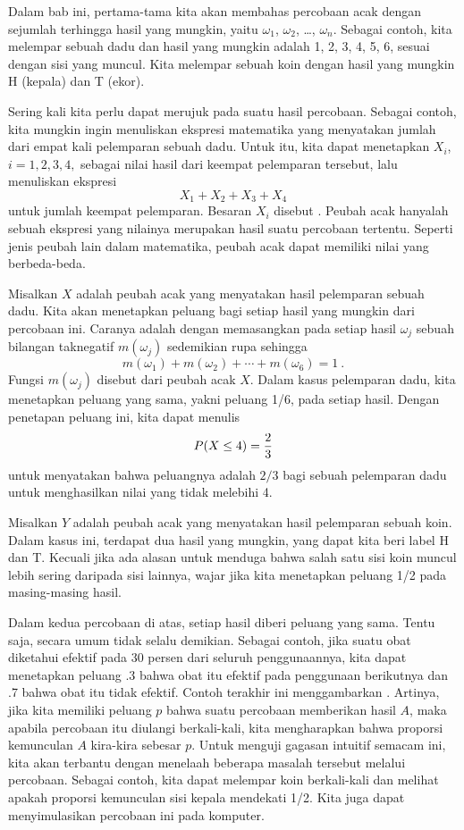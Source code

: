 Dalam bab ini, pertama-tama kita akan membahas percobaan acak dengan sejumlah
terhingga hasil yang mungkin, yaitu $\omega_1$, $\omega_2$, \dots, $\omega_n$.  Sebagai contoh, kita
melempar sebuah dadu dan hasil yang mungkin adalah 1, 2, 3, 4, 5, 6, sesuai dengan
sisi yang muncul.  Kita melempar sebuah koin dengan hasil yang mungkin H (kepala) dan T
(ekor).  
\par
Sering kali kita perlu dapat merujuk pada suatu hasil percobaan.  Sebagai 
contoh, kita mungkin ingin menuliskan ekspresi matematika yang menyatakan jumlah dari empat kali pelemparan
sebuah dadu.  Untuk itu, kita dapat menetapkan $X_i$, $i = 1, 2, 3, 4,$ sebagai nilai
hasil dari keempat pelemparan tersebut, lalu menuliskan ekspresi
$$X_1 + X_2 + X_3 + X_4$$
untuk jumlah keempat pelemparan.  Besaran $X_i$ disebut .
Peubah acak hanyalah sebuah ekspresi yang nilainya merupakan hasil suatu
percobaan tertentu.  Seperti jenis peubah lain dalam matematika, peubah acak
dapat memiliki nilai yang berbeda-beda.
\par
Misalkan $X$ adalah peubah acak yang menyatakan hasil pelemparan sebuah dadu.  Kita akan menetapkan
peluang bagi setiap hasil yang mungkin dari percobaan ini.  Caranya adalah dengan memasangkan pada setiap
hasil $\omega_j$ sebuah bilangan taknegatif $m(\omega_j)$ sedemikian rupa sehingga
$$ 
m(\omega_1) + m(\omega_2) + \cdots + m(\omega_6) = 1\ .
$$
Fungsi $m(\omega_j)$ disebut  dari peubah acak
$X$.  Dalam kasus pelemparan dadu, kita menetapkan peluang yang sama, yakni
peluang 1/6, pada setiap hasil.  Dengan penetapan peluang ini, kita dapat menulis
$$
P(X \le 4) = {2\over 3}
$$
untuk menyatakan bahwa peluangnya adalah $2/3$ bagi sebuah pelemparan dadu untuk menghasilkan nilai yang
tidak melebihi 4.  
\par
Misalkan $Y$ adalah peubah acak yang menyatakan hasil pelemparan sebuah koin.  Dalam kasus ini, terdapat
dua hasil yang mungkin, yang dapat kita beri label H dan T.  Kecuali jika ada alasan untuk menduga bahwa
salah satu sisi koin muncul lebih sering daripada sisi lainnya, wajar jika kita menetapkan
peluang 1/2 pada masing-masing hasil.
\par
Dalam kedua percobaan di atas, setiap hasil diberi peluang yang sama.  Tentu saja, secara umum
tidak selalu demikian.  Sebagai contoh, jika suatu obat diketahui efektif pada 30 persen dari seluruh
penggunaannya, kita dapat menetapkan peluang .3 bahwa obat itu efektif pada penggunaan berikutnya dan
.7 bahwa obat itu tidak efektif.  Contoh terakhir ini menggambarkan .  Artinya, jika kita memiliki peluang $p$ bahwa 
suatu percobaan memberikan hasil $A$, maka apabila percobaan itu diulangi berkali-kali, 
kita mengharapkan bahwa
proporsi kemunculan $A$ kira-kira sebesar $p$.  Untuk menguji gagasan intuitif semacam ini, kita akan
terbantu dengan menelaah beberapa masalah tersebut melalui percobaan.  Sebagai 
contoh, kita dapat melempar koin berkali-kali dan melihat apakah proporsi kemunculan sisi kepala 
mendekati 1/2.  Kita juga dapat menyimulasikan percobaan ini pada komputer.

